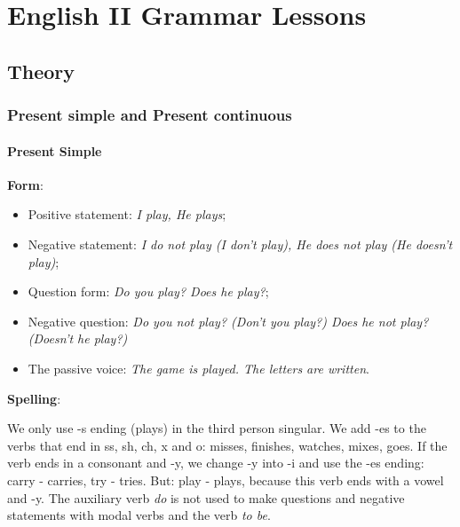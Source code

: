 
\chapter{English II Grammar Lessons}
\label{cap:gram}

\section{Theory}

\subsection{Present simple and Present continuous}

\subsubsection{Present Simple}

\textbf{Form}:

\begin{itemize}

\item Positive statement: \textit{I play, He plays};
\item Negative statement: \textit{I do not play (I don't play), He does not play (He doesn't play)};
\item Question form: \textit{Do you play? Does he play?};
\item Negative question: \textit{Do you not play? (Don't you play?) Does he not play? (Doesn't he play?)}
\item The passive voice: \textit{The game is played. The letters are written}.

\end{itemize}

\textbf{Spelling}:

We only use -s ending (plays) in the third person singular. We add -es to the verbs that end in ss, sh, ch, x and o: misses, finishes, watches, mixes, goes. If the verb ends in a consonant and -y, we change -y into -i and use the -es ending: carry - carries, try - tries. But: play - plays, because this verb ends with a vowel and -y. The auxiliary verb \textit{do} is not used to make questions and negative statements with modal verbs and the verb \textit{to be}.

